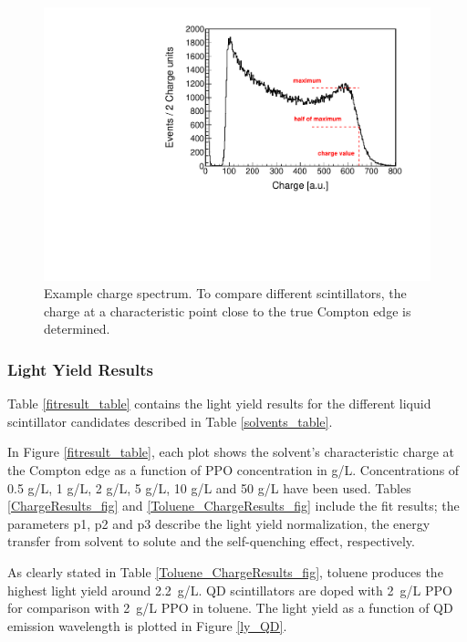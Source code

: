 \documentclass{JINST}
\begin{document}
\begin{figure}[tbh]
        \begin{center}
        \includegraphics[scale=0.6]{graphs/toluene_5gL_PPO_Floats_final.pdf}
\caption[]{Example charge spectrum. To compare different scintillators, the charge at a characteristic point close to the true Compton edge is determined. \label{ChargeSpec_fig}}
 \end{center}
\end{figure}

\subsubsection{Light Yield Results}\label{ly_results}
Table \ref{fitresult_table} contains the light yield results for the different liquid scintillator candidates described in Table \ref{solvents_table}.

In Figure \ref{fitresult_table}, each plot shows the solvent's characteristic charge at the Compton edge as a function of PPO concentration in g/L. Concentrations of 0.5 g/L, 1 g/L, 2 g/L, 5 g/L, 10 g/L and 50 g/L have been used. Tables \ref{ChargeResults_fig} and \ref{Toluene_ChargeResults_fig} include the fit results; the parameters p1, p2 and p3 describe the light yield normalization,
the energy transfer from solvent to solute and the self-quenching effect, respectively.

As clearly stated in Table \ref{Toluene_ChargeResults_fig}, toluene produces the highest light yield around 2.2~g/L.  QD scintillators are doped with 2~g/L PPO for comparison with 2~g/L PPO in toluene. The light yield as a function of QD emission wavelength is plotted in Figure \ref{ly_QD}.
\end{document}
